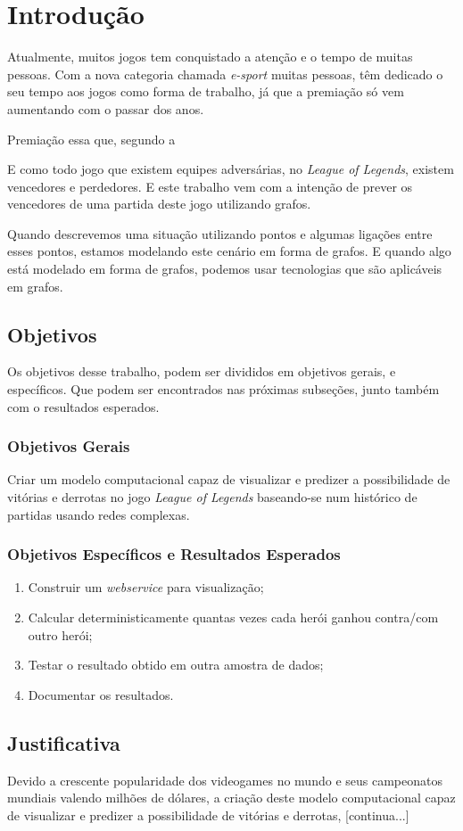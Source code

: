 \chapter{Introdução}
\label{chap:Introducao}

Atualmente, muitos jogos tem conquistado a atenção e o tempo de muitas pessoas. Com a nova categoria chamada \textit{e-sport} muitas pessoas, têm dedicado o seu tempo aos jogos como forma de trabalho, já que a premiação só vem aumentando com o passar dos anos.

Premiação essa que, segundo a \citet{espn}


E como todo jogo que existem equipes adversárias, no \textit{League of Legends}, existem vencedores e perdedores. E este trabalho vem com a intenção de prever os vencedores de uma partida deste jogo utilizando grafos.

Quando descrevemos uma situação utilizando pontos e algumas ligações entre esses pontos, estamos modelando este cenário em forma de grafos. E quando algo está modelado em forma de grafos, podemos usar tecnologias que são aplicáveis em grafos.

\section{Objetivos}
Os objetivos desse trabalho, podem ser divididos em objetivos gerais, e específicos. Que podem ser encontrados nas próximas subseções, junto também com o resultados esperados.
\subsection{Objetivos Gerais}
Criar um modelo computacional capaz de visualizar e predizer a possibilidade de vitórias e derrotas no jogo \textit{League of Legends} baseando-se num histórico de partidas usando redes complexas.

\subsection{Objetivos Específicos e Resultados Esperados}

\begin{enumerate}
\item Construir um \textit{webservice} para visualização;
\item Calcular deterministicamente quantas vezes cada herói ganhou contra/com outro herói;
\item Testar o resultado obtido em outra amostra de dados;
\item Documentar os resultados.

\end{enumerate}

\section{Justificativa}
Devido a crescente popularidade dos videogames no mundo e seus campeonatos mundiais valendo milhões de dólares, a criação deste modelo computacional capaz de visualizar e predizer a possibilidade de vitórias e derrotas, [continua...]